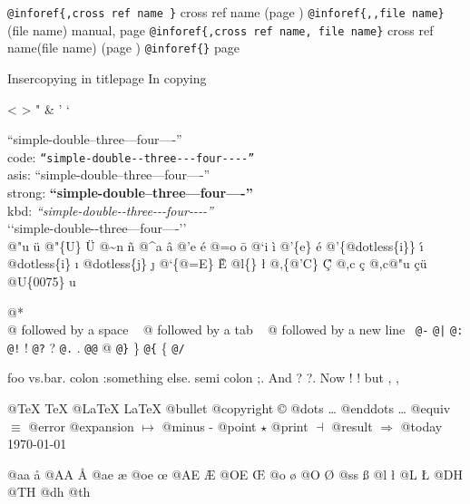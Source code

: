 \documentclass{book}
\begin{document}
\begin{titlepage}
\texttt{@inforef\{,cross ref name \}} cross ref name (page \pageref{anchor:})
\texttt{@inforef\{,,file name\}} (file name) manual, page \pageref{anchor:}
\texttt{@inforef\{,cross ref name, file name\}} cross ref name(file name) (page \pageref{anchor:})
\texttt{@inforef\{\}} page \pageref{anchor:}



Insercopying in titlepage
In copying

<
>
"
\&
'
`

``simple-double--three---four----''\leavevmode{}\\
code: \texttt{``simple-double{-}{-}three{-}{-}{-}four{-}{-}{-}-''} \leavevmode{}\\
asis: ``simple-double--three---four----'' \leavevmode{}\\
strong: \textbf{``simple-double--three---four----''} \leavevmode{}\\
kbd: {\ttfamily\textsl{``simple-double{-}{-}three{-}{-}{-}four{-}{-}{-}-''}} \leavevmode{}\\

`\hbox{}`simple-double-\hbox{}-three---four----'\hbox{}'\leavevmode{}\\


@"u \"{u} 
@"\{U\} \"{U} 
@\~{}n \~{n}
@\^{}a \^{a}
@'e \'{e}
@=o \={o}
@`i \`{i}
@'\{e\} \'{e}
@'\{@dotless\{i\}\} \'{\i{}} 
@dotless\{i\} \i{}
@dotless\{j\} \j{}
@`\{@=E\} \`{\={E}} 
@l\{\} \l{}
@,\{@'C\} \c{\'{C}}
@,c \c{c}
@,c@"u \c{c}\"{u} \leavevmode{}\\

@U\{0075\} u

@* \leavevmode{}\\
@ followed by a space
\ {}
@ followed by a tab
\ {}
@ followed by a new line
\ {}\texttt{@-} \-{}
\texttt{@|} 
\texttt{@:} \@
\texttt{@!} \@!
\texttt{@?} \@?
\texttt{@.} \@.
\texttt{@@} @
\texttt{@\}} \}
\texttt{@\{} \{
\texttt{@/} 

foo vs.\@ bar. 
colon :\@And something else.
semi colon ;\@.
And ? ?\@.
Now ! !\@@
but , ,\@

@TeX \TeX{}
@LaTeX \LaTeX{}
@bullet \textbullet{}
@copyright \copyright{}
@dots \dots{}\@
@enddots \dots{}
@equiv $\equiv{}$
@error 
@expansion $\mapsto{}$
@minus -
@point $\star{}$
@print $\dashv{}$
@result $\Rightarrow{}$
@today \today{}

@aa \aa{}
@AA \AA{}
@ae \ae{}
@oe \oe{}
@AE \AE{}
@OE \OE{}
@o \o{}
@O \O{}
@ss \ss{}
@l \l{}
@L \L{}
@DH \DH{}
@TH \TH{}
@dh \dh{}
@th \th{}


\end{titlepage}
\end{document}
